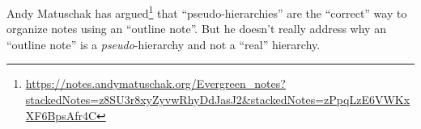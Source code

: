 \begin{node}\label{amn-0004}%
Andy Matuschak has argued\footnote{\url{https://notes.andymatuschak.org/Evergreen_notes?stackedNotes=z8SU3r8xyZyvwRhyDdJasJ2&stackedNotes=zPpqLzE6VWKxXF6BpsAfr4C}}
that ``pseudo-hierarchies'' are the ``correct'' way to organize
notes using an ``outline note''. But he doesn't really address why an
``outline note'' is a \emph{pseudo}-hierarchy and not a ``real''
hierarchy. 
\end{node}
